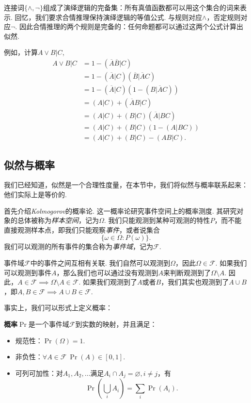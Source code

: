 连接词$\{\wedge,\neg\}$组成了演绎逻辑的完备集：所有真值函数都可以用这个集合的词来表示. 回忆，我们要求合情推理保持演绎逻辑的等值公式. 与规则对应$\wedge$，否定规则对应$\neg$. 因此合情推理的两个规则是完备的：任何命题都可以通过这两个公式计算出似然.

\begin{example}
    例如，计算$A\vee B|C$,
    \begin{align*}
        A \vee B|C 
        &= 1 - (\overline{A}\overline{B}|C)\\
        & = 1 - (\overline{A}|C)(\overline{B}|\overline{A}C) \\
        &= 1 - (\overline{A}|C)(1 - (B|\overline{A}C))\\
        &= (A|C) + (\overline{A}B|C) \\
        &= (A|C) + (B|C)(\overline{A}|BC) \\
        &= (A|C) + (B|C)(1 - (A|BC)) \\
        &= (A|C) + (B|C) - (AB|C).
    \end{align*}
\end{example}


\subsection{似然与概率}
我们已经知道，似然是一个合理性度量，在本节中，我们将似然与概率联系起来：他们实际上是等价的.

首先介绍\emph{Kolmogorov}的概率论. 这一概率论研究事件空间上的概率测度. 其研究对象的总体被称为\emph{样本空间}，记为$\Omega$. 我们只能观测到某种可观测的特性$P$，而不能直接观测样本点，即我们只能观察\emph{事件}，或者说集合
    \[\{\omega\in \Omega:P(\omega)\}.\]
我们可以观测的所有事件的集合称为\emph{事件域}，记为$\mathscr{F}$.

事件域$\mathscr{F}$中的事件之间互相有关联. 我们自然可以观测到$\Omega$，因此$\Omega\in\mathscr{F}$. 如果我们可以观测到事件$A$，那么我们也可以通过没有观测到$A$来判断观测到了$\Omega\setminus A$. 因此，$A\in\mathscr{F}\implies \Omega\setminus A\in\mathscr{F}$. 如果我们观测到了$A$或者$B$，我们其实也观测到了$A\cup B$，即$A,B\in\mathscr{F}\implies A\cup B\in\mathscr{F}$.

事实上，我们可以形式上定义概率：
\begin{definition}[概率]
\textbf{概率}$\Pr$是一个事件域$\mathscr{F}$到实数的映射，并且满足：
    \begin{itemize}
        \item 规范性：$\Pr(\Omega)=1$.
        \item 非负性：$\forall A\in\mathscr{F}~\Pr(A)\in[0,1]$.
        \item 可列可加性：对$A_1,A_2,\dots$满足$A_i\cap A_j=\varnothing,i\neq j$，有
        \[\Pr\left(\bigcup_i A_i\right)=\sum_i \Pr(A_i).\]
    \end{itemize}
\end{definition}

